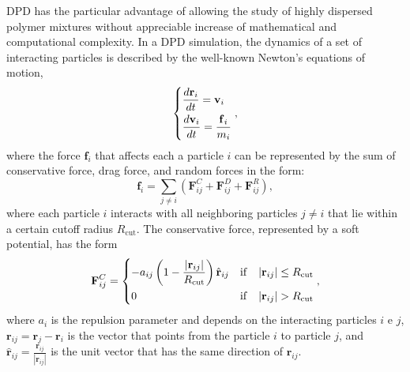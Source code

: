 \documentclass[
journal=mamobx,
manuscript=article,
]{achemso}
\newcommand{\vt}[1]{\boldsymbol{\mathbf{#1}}}          %
\begin{document}
DPD has the particular advantage of allowing the study of highly dispersed polymer mixtures without appreciable increase of mathematical and computational complexity.
In a DPD simulation, the dynamics of a set of interacting particles is described by the well-known Newton's equations of motion,
\begin{equation}
\begin{dcases}
\frac{d {\vt r}_i}{dt} = {\vt v}_i \\
\frac{d {\vt v}_i}{dt} = \frac{{\vt f}_i}{m_i}
\end{dcases},
\end{equation}
where the force ${\vt f}_i$ that affects each a particle $i$ can be represented by the sum of conservative force, drag force, and random forces in the form:
\begin{equation}
{\vt f}_i = \sum_{j \neq i} ({\vt F}^C_{ij} + {\vt F}^D_{ij} + {\vt F}^R_{ij}),
\end{equation}
where each particle $i$ interacts with all neighboring particles $j \neq i$ that lie within a certain cutoff radius $R_\mathrm{cut}$.
The conservative force, represented by a soft potential, has the form \cite{Groot_1997}
\begin{equation}
\label{eq:conservative force}
{\vt F}^C_{ij} = \begin{dcases}
-a_{ij} \left(1 - \frac{|{\vt r}_{ij}|}{R_\mathrm{cut}}\right) \hat{\vt r}_{ij} & \mathrm{if} \quad |{\vt r}_{ij}| \leq R_\mathrm{cut} \\
0 & \mathrm{if} \quad |{\vt r}_{ij}| > R_\mathrm{cut}
\end{dcases},
\end{equation}
where $a_i$ is the repulsion parameter and depends on the interacting particles $i$ e $j$, ${\vt r}_{ij} = {\vt r}_j - {\vt r}_i$ is the vector that points from the particle $i$ to particle $j$, and $\hat{\vt r}_{ij} = \frac{{\vt r}_{ij}}{|{\vt r}_{ij}|}$ is the unit vector that has the same direction of ${\vt r}_{ij}$.
\end{document}
